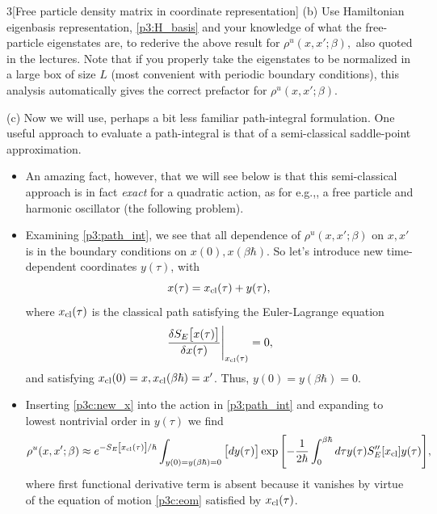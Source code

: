 \documentclass[12pt]{article}
\begin{document}
\begin{problem}{3}[Free particle density matrix in coordinate representation]
(b) Use Hamiltonian eigenbasis representation, \cref{p3:H_basis} and your
knowledge of what the free-particle eigenstates are, to rederive the above
result for $\rho^u(x,x';\beta),$ also quoted in the lectures. Note that if you
properly take the eigenstates to be normalized in a large box of size $L$ (most
convenient with periodic boundary conditions), this analysis automatically gives
the correct prefactor for $\rho^u(x,x';\beta)$.
\begin{solution}
    
\end{solution}

(c) Now we will use, perhaps a bit less familiar path-integral formulation. One
useful approach to evaluate a path-integral is that of a semi-classical
saddle-point approximation.

\begin{itemize}
    \item An amazing fact, however, that we will see below is that this
        semi-classical approach is in fact \textit{exact} for a quadratic
        action, as for e.g.,, a free particle and harmonic oscillator (the
        following problem).
    \item Examining \cref{p3:path_int}, we see that all dependence of
        $\rho^u(x,x';\beta)$ on $x,x'$ is in the boundary conditions on
        $x(0),x(\beta\hbar)$. So let's introduce new time-dependent coordinates
        $y(\tau)$, with
        \begin{equation}\label{p3c:new_x}
            x(\tau)=x_{\text{cl}}(\tau)+y(\tau), 
        \end{equation}
        where $x_{\text{cl}}(\tau)$ is the classical path satisfying the
        Euler-Lagrange equation
        \begin{equation}\label{p3c:eom}
            \eval{\frac{\delta S_E\qty[x(\tau)]}{\delta
            x(\tau)}}_{x_\t{cl}(\tau)}=0, 
        \end{equation}
        and satisfying $x_{\text{cl}}(0)=x,x_{\text{cl}}(\beta\hbar)=x'$. Thus,
        $y(0)=y(\beta\hbar)=0$.

    \item Inserting \cref{p3c:new_x} into the action in \cref{p3:path_int} and
        expanding to lowest nontrivial order in $y(\tau)$ we find
        \begin{equation}\label{p3c:approx_dens_matrix}
            \rho^u(x,x';\beta)\approx
            e^{-S_E\qty[x_{\text{cl}}(\tau)]/\hbar}
            \int_{y(0)=y(\beta\hbar)=0}\qty[dy(\tau)]
            \exp\qty[-\frac1{2\hbar}\int_0^{\beta\hbar}d\tau
            y(\tau)S_E''[x_{\text{cl}}]y(\tau)],
        \end{equation}
        where first functional derivative term is absent because it vanishes by
        virtue of the equation of motion \cref{p3c:eom} satisfied by 
        $x_{\text{cl}}(\tau)$.


\end{itemize}
\end{problem}
\end{document}
